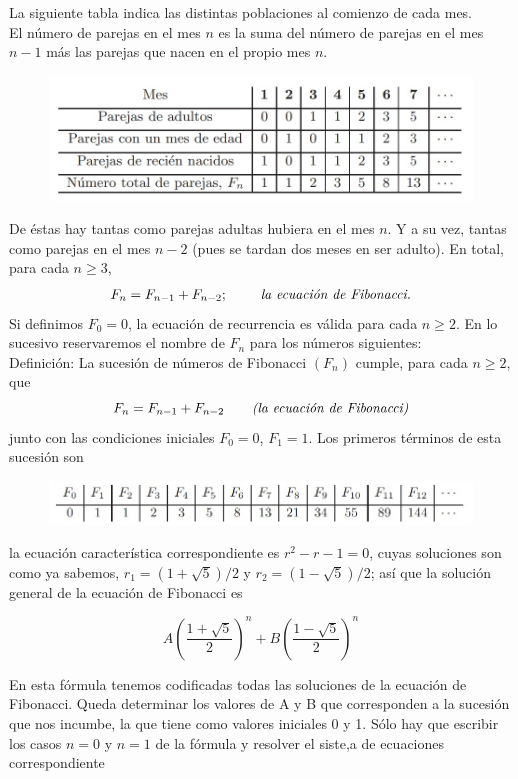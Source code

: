 \documentclass{article}
\begin{document}
La siguiente tabla indica las distintas poblaciones al comienzo de cada mes.\\
El número de parejas en el mes $n$ es la suma del número de parejas en el mes $n-1$ más las parejas que nacen en el propio mes $n$.

\begin{figure}[h]
    \centering
    \includegraphics[scale=0.5]{y.jpg}
\end{figure}

De éstas hay tantas como parejas adultas hubiera en el mes $n$. Y a su vez, tantas como parejas en el mes $n-2$ (pues se tardan dos meses en ser adulto). En total, para cada $n \geq 3$,
$$F_n = F_{n-1} + F_{n-2}; \textit{ \qquad la ecuación de Fibonacci.}$$
Si definimos $F_0 = 0$, la ecuación de recurrencia es válida para cada $n \geq 2$. En lo sucesivo reservaremos el nombre de $F_n$ para los números siguientes:\\


Definición: La sucesión de números de Fibonacci $(F_n)$ cumple, para cada $n \geq 2$, que
$$F_n=F_{n-1} + F_{n-2} \textit{\qquad (la ecuación de Fibonacci)}$$
junto con las condiciones iniciales $F_0=0$, $F_1=1$. Los primeros términos de esta sucesión son

\begin{figure}[h]
    \centering
    \includegraphics[scale=0.5]{x.jpg}
\end{figure}

la ecuación característica correspondiente es $r^2 - r -1 =0$, cuyas soluciones son como ya sabemos, $r_1 = (1 + \sqrt{5})/2$ y $r_2 = (1 - \sqrt{5})/2$; así que la solución general de la ecuación de Fibonacci es 

$$A (\frac{1 + \sqrt{5}}{2})^n + B(\frac{1-\sqrt{5}}{2})^n$$

En esta fórmula tenemos codificadas todas las soluciones de la ecuación de Fibonacci. Queda determinar los valores de A y B que corresponden a la sucesión que nos incumbe, la que tiene como valores iniciales 0 y 1. Sólo hay que escribir los casos $n=0$ y $n=1$ de la fórmula y resolver el siste,a de ecuaciones correspondiente 
\end{document}
